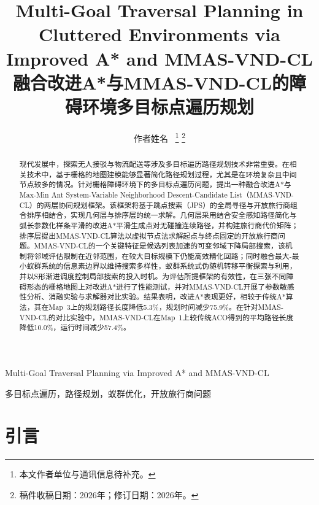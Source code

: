 \documentclass[lettersize,journal]{IEEEtran}
\begin{document}
\title{Multi-Goal Traversal Planning in Cluttered Environments via Improved A* and MMAS-VND-CL\\
{\normalsize 融合改进A*与MMAS-VND-CL的障碍环境多目标点遍历规划}}

\author{作者姓名~%
\thanks{本文作者单位与通讯信息待补充。}%
\thanks{稿件收稿日期：2026年；修订日期：2026年。}}

%
{Multi-Goal Traversal Planning via Improved A* and MMAS-VND-CL}

\maketitle

\begin{abstract}

现代发展中，探索无人接驳与物流配送等涉及多目标遍历路径规划技术非常重要。在相关技术中，基于栅格的地图建模能够显著简化路径规划过程，尤其是在环境复杂且中间节点较多的情况。针对栅格障碍环境下的多目标点遍历问题，提出一种融合改进A*与 Max-Min Ant System-Variable Neighborhood Descent-Candidate List（MMAS-VND-CL）的两层协同规划框架。该框架将基于跳点搜索（JPS）的全局寻径与开放旅行商组合排序相结合，实现几何层与排序层的统一求解。几何层采用结合安全感知路径简化与弧长参数化样条平滑的改进A*平滑生成点对无碰撞连续路径，并构建旅行商代价矩阵；排序层提出MMAS-VND-CL算法以虚拟节点法求解起点与终点固定的开放旅行商问题。MMAS-VND-CL的一个关键特征是候选列表加速的可变邻域下降局部搜索，该机制将邻域评估限制在近邻范围，在较大目标规模下仍能高效精化回路；同时融合最大-最小蚁群系统的信息素边界以维持搜索多样性，蚁群系统式伪随机转移平衡探索与利用，并以S形渐进调度控制局部搜索的投入时机。为评估所提框架的有效性，在三张不同障碍形态的栅格地图上对改进A*进行了性能测试，并对MMAS-VND-CL开展了参数敏感性分析、消融实验与求解器对比实验。结果表明，改进A*表现更好，相较于传统A*算法，其在Map~3上的规划路径长度降低5.3\%，规划时间减少75.9\%。在针对MMAS-VND-CL的对比实验中，MMAS-VND-CL在Map~1上较传统ACO得到的平均路径长度降低10.0\%，运行时间减少57.4\%。

\end{abstract}

\begin{IEEEkeywords}

多目标点遍历，路径规划，蚁群优化，开放旅行商问题

\end{IEEEkeywords}

\section{引言}
\end{document}
